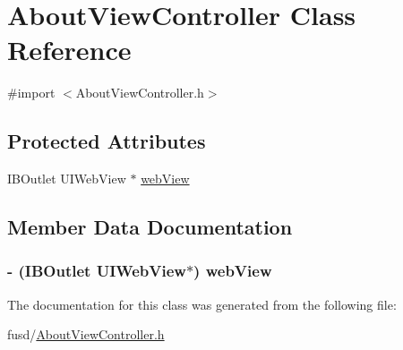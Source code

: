 \hypertarget{interface_about_view_controller}{
\section{\-About\-View\-Controller \-Class \-Reference}
\label{interface_about_view_controller}
}


{\ttfamily \#import $<$\-About\-View\-Controller.\-h$>$}

\subsection*{\-Protected \-Attributes}
\begin{DoxyCompactItemize}
\item 
\-I\-B\-Outlet \-U\-I\-Web\-View $\ast$ \hyperlink{interface_about_view_controller_a3a7d96f2dadd58dc73526ae53c670434}{web\-View}
\end{DoxyCompactItemize}


\subsection{\-Member \-Data \-Documentation}
\hypertarget{interface_about_view_controller_a3a7d96f2dadd58dc73526ae53c670434}{
\subsubsection[{web\-View}]{\setlength{\rightskip}{0pt plus 5cm}-\/ (\-I\-B\-Outlet \-U\-I\-Web\-View$\ast$) {\bf web\-View}}}
\label{interface_about_view_controller_a3a7d96f2dadd58dc73526ae53c670434}


\-The documentation for this class was generated from the following file\-:\begin{DoxyCompactItemize}
\item 
fusd/\hyperlink{_about_view_controller_8h}{\-About\-View\-Controller.\-h}\end{DoxyCompactItemize}
